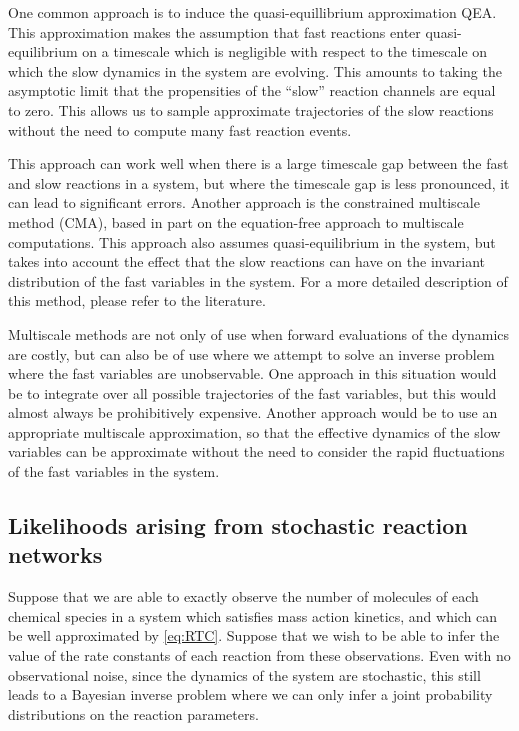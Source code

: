 \documentclass[final]{siamltex}
\begin{document}
One common approach is to induce the quasi-equillibrium approximation
QEA. This approximation makes the assumption that fast reactions
enter quasi-equilibrium on a timescale which is negligible with
respect to the timescale on which the slow dynamics in the system are
evolving. This amounts to taking the asymptotic limit that the
propensities of the ``slow'' reaction channels are equal to zero. This
allows us to sample approximate trajectories of the slow reactions
without the need to compute many fast reaction events.

This approach can work well when there is a large timescale gap
between the fast and slow reactions in a system, but where the
timescale gap is less pronounced, it can lead to significant
errors\cite{cotter2016error}. Another approach is the
constrained multiscale method (CMA)\cite{cotter2011constrained,cotter2016constrained}, based in part on the
equation-free approach to multiscale computations\cite{kevrekidis2003equation,erban2006gene}. This approach also assumes quasi-equilibrium in the
system, but takes into account the effect that the slow reactions can
have on the invariant distribution of the fast variables in the
system. For a more detailed description of this method, please refer
to the literature\cite{cotter2016constrained}.

Multiscale methods are not only of use when forward evaluations of the
dynamics are costly, but can also be of use where we attempt to solve
an inverse problem where the fast variables are unobservable. One
approach in this situation would be to integrate over all possible
trajectories of the fast variables, but this would almost always be
prohibitively expensive. Another approach would be to use an
appropriate multiscale approximation, so that the effective dynamics
of the slow variables can be approximate without the need to consider
the rapid fluctuations of the fast variables in the system.

\subsection{Likelihoods arising from stochastic reaction networks}
Suppose that we are able to exactly observe the number of molecules of
each chemical species in a system which satisfies mass action
kinetics, and which can be well approximated by
\eqref{eq:RTC}. Suppose that we wish to be able to infer the value of
the rate constants of each reaction from these observations. Even with no observational noise, since the dynamics
of the system are stochastic, this still leads to a Bayesian inverse
problem where we can only infer a joint probability distributions on the
reaction parameters.
\end{document}
